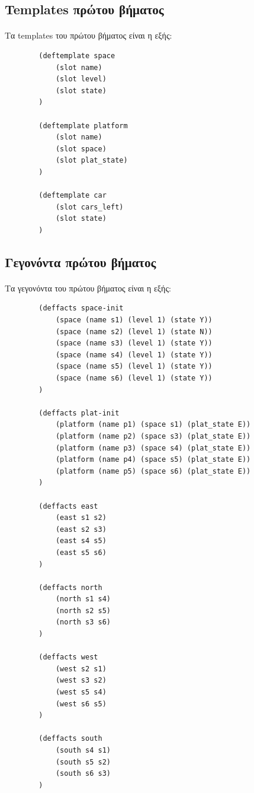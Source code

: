 \documentclass{article}
\begin{document}
    \subsection{Templates πρώτου βήματος}
    \paragraph{}
    Τα templates του πρώτου βήματος είναι η εξής:

    \begin{lstlisting}
        (deftemplate space
            (slot name)
            (slot level)
            (slot state)
        )

        (deftemplate platform
            (slot name)
            (slot space)
            (slot plat_state)
        )

        (deftemplate car
            (slot cars_left)
            (slot state)
        )
    \end{lstlisting}

    \subsection{Γεγονόντα πρώτου βήματος}
    \paragraph{}
    Τα γεγονόντα του πρώτου βήματος είναι η εξής:

    \begin{lstlisting}
        (deffacts space-init
            (space (name s1) (level 1) (state Y))
            (space (name s2) (level 1) (state N))
            (space (name s3) (level 1) (state Y))
            (space (name s4) (level 1) (state Y))
            (space (name s5) (level 1) (state Y))
            (space (name s6) (level 1) (state Y))
        )

        (deffacts plat-init
            (platform (name p1) (space s1) (plat_state E))
            (platform (name p2) (space s3) (plat_state E))
            (platform (name p3) (space s4) (plat_state E))
            (platform (name p4) (space s5) (plat_state E))
            (platform (name p5) (space s6) (plat_state E))
        )

        (deffacts east
            (east s1 s2)
            (east s2 s3)
            (east s4 s5)
            (east s5 s6)
        )

        (deffacts north
            (north s1 s4)
            (north s2 s5)
            (north s3 s6)
        )

        (deffacts west
            (west s2 s1)
            (west s3 s2)
            (west s5 s4)
            (west s6 s5)
        )

        (deffacts south
            (south s4 s1)
            (south s5 s2)
            (south s6 s3)
        )
    \end{lstlisting}
\end{document}
